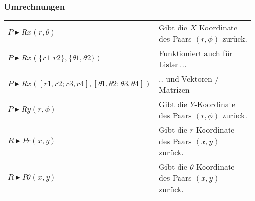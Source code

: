 \subsubsection{Umrechnungen}
\begin{tabular}{|l|l|}
	\hline
	$P \blacktriangleright Rx(r,\theta)$						& Gibt die $X$-Koordinate des Paars $(r,\phi)$ zurück.		\\ 
	$P \blacktriangleright Rx(\{r1,r2\},\{\theta 1,\theta 2\})$	& Funktioniert auch für Listen...							\\ 
	$P \blacktriangleright Rx([r1,r2;r3,r4],[\theta 1,\theta 2; \theta 3, \theta 4 ]) $
																& .. und Vektoren / Matrizen								\\ \hline
	$P \blacktriangleright Ry(r,\phi)$							& Gibt die $Y$-Koordinate des Paars $(r,\phi)$ zurück.		\\ \hline
	$R \blacktriangleright Pr(x,y) $							& Gibt die $r$-Koordinate des Paars $(x,y)$ zurück.			\\ \hline
	$R \blacktriangleright P \theta(x,y)$						& Gibt die $\theta$-Koordinate des Paars $(x,y)$ zurück.	\\ \hline
\end{tabular}